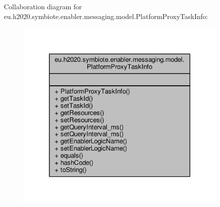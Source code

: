 Collaboration diagram for eu.\+h2020.\+symbiote.\+enabler.\+messaging.\+model.\+Platform\+Proxy\+Task\+Info\+:\nopagebreak
\begin{figure}[H]
\begin{center}
\leavevmode
\includegraphics[width=296pt]{classeu_1_1h2020_1_1symbiote_1_1enabler_1_1messaging_1_1model_1_1PlatformProxyTaskInfo__coll__graph}
\end{center}
\end{figure}
